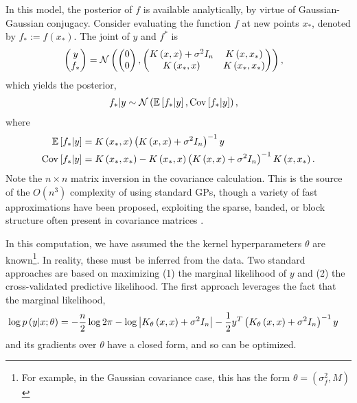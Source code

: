 \documentclass[14pt]{extarticle}
\begin{document}
In this model, the posterior of $f$ is available analytically, by virtue of
Gaussian-Gaussian conjugacy. Consider evaluating the function $f$ at new points
$x_{\ast}$, denoted by $f_{\ast} := f\left(x_{\ast}\right)$. The joint of $y$
and $f^{\ast}$ is
\begin{align*}
  \begin{pmatrix}
    y \\ f_{\ast}
  \end{pmatrix} &= \mathcal{N}\left(
 \begin{pmatrix}
   0 \\ 0
 \end{pmatrix} ,
\begin{pmatrix}
  K\left(x, x\right) + \sigma^{2}I_{n} & K\left(x, x_{\ast}\right) \\
  K\left(x_{\ast}, x\right) & K\left(x_{\ast}, x_{\ast}\right)
\end{pmatrix}
  \right),
\end{align*}
which yields the posterior,
\begin{align*}
  f_{\ast} \vert y &\sim \mathcal{N}\left(\mathbb{E}\left[{f_{\ast} \vert y}\right], \mathrm{Cov}\left[{f_{\ast} \vert y}\right]\right),
\end{align*}
where
\begin{align*}
  \mathbb{E}\left[{f_{\ast} \vert y}\right] &= K\left(x_{\ast}, x\right)\left(K\left(x, x\right) + \sigma^{2}I_{n}\right)^{-1}y \\
  \mathrm{Cov}\left[{f_{\ast} \vert y}\right] &= K\left(x_{\ast}, x_{\ast}\right) - K\left(x_{\ast}, x\right)\left(K\left(x, x\right) + \sigma^{2}I_{n}\right)^{-1}K\left(x, x_{\ast}\right).
\end{align*}
Note the $n\times n$ matrix inversion in the covariance calculation. This is the
source of the $O\left(n^{3}\right)$ complexity of using standard GPs, though a
variety of fast approximations have been proposed, exploiting the sparse,
banded, or block structure often present in covariance matrices
\citep{quinonero2007approximation}.

In this computation, we have assumed the the kernel hyperparameters $\theta$ are
known\footnote{For example, in the Gaussian covariance case, this has the form
  $\theta = \left(\sigma_{f}^{2}, M\right)$}. In reality, these must be inferred
from the data. Two standard approaches are based on maximizing (1) the marginal
likelihood of $y$ and (2) the cross-validated predictive likelihood. The first
approach leverages the fact that the marginal likelihood,
\begin{align*}
  \log p\left(y \vert x; \theta\right) &= -\frac{n}{2}\log 2\pi - \log\left|K_{\theta}\left(x, x\right) + \sigma^{2}I_{n}\right| - \frac{1}{2}y^{T}\left(K_{\theta}\left(x, x\right) + \sigma^{2}I_{n}\right)^{-1}y
\end{align*}
and its gradients over $\theta$ have a closed form, and so can be optimized.
\end{document}
